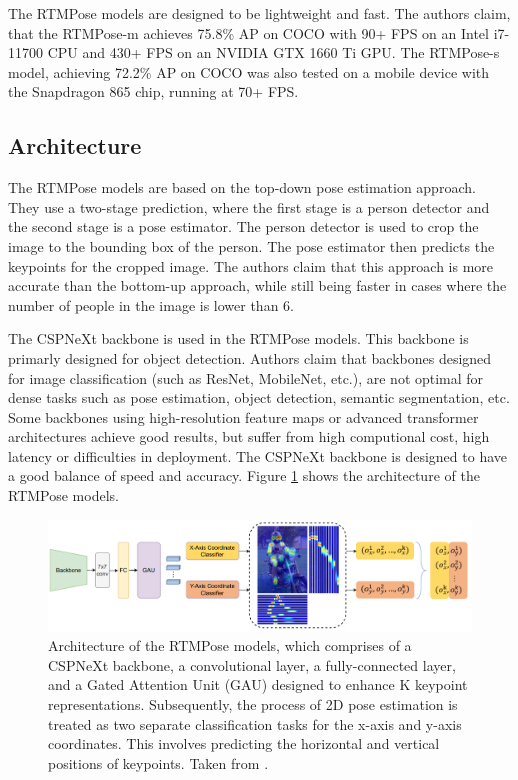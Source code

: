 The RTMPose models are designed to be lightweight and fast. The authors claim, that the RTMPose-m achieves 75.8\% AP on COCO with 90+ FPS on an Intel i7-11700 CPU and 430+ FPS on an NVIDIA GTX 1660 Ti GPU. The RTMPose-s model, achieving 72.2\% AP on COCO was also tested on a mobile device with the Snapdragon 865 chip, running at 70+ FPS.

\subsection{Architecture}

The RTMPose models are based on the top-down pose estimation approach. They use a two-stage prediction, where the first stage is a person detector and the second stage is a pose estimator. The person detector is used to crop the image to the bounding box of the person. The pose estimator then predicts the keypoints for the cropped image. The authors claim that this approach is more accurate than the bottom-up approach, while still being faster in cases where the number of people in the image is lower than 6.

The CSPNeXt backbone is used in the RTMPose models. This backbone is primarly designed for object detection. Authors claim that backbones designed for image classification (such as ResNet, MobileNet, etc.), are not optimal for dense tasks such as pose estimation, object detection, semantic segmentation, etc. Some backbones using high-resolution feature maps or advanced transformer architectures achieve good results, but suffer from high computional cost, high latency or difficulties in deployment. The CSPNeXt backbone is designed to have a good balance of speed and accuracy. Figure \ref{fig:rtmpose_architecture} shows the architecture of the RTMPose models.

\begin{figure}[htb]
    \centering
    \includegraphics[width=\textwidth]{obrazky-figures/rtmpose_architecture.png}
    \caption{Architecture of the RTMPose models, which comprises of a CSPNeXt backbone, a convolutional layer, a fully-connected layer, and a Gated Attention Unit (GAU) designed to enhance K keypoint representations. Subsequently, the process of 2D pose estimation is treated as two separate classification tasks for the x-axis and y-axis coordinates. This involves predicting the horizontal and vertical positions of keypoints. Taken from \cite{rtmpose}.}
    \label{fig:rtmpose_architecture}
\end{figure}

